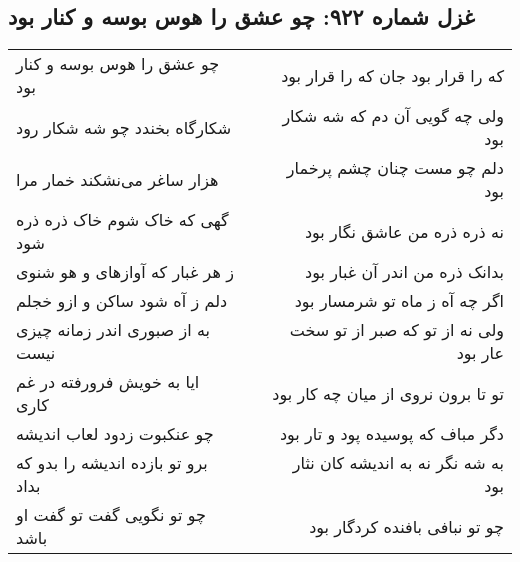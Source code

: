 \begin{center}
\section*{غزل شماره ۹۲۲: چو عشق را هوس بوسه و کنار بود}
\label{sec:0922}
\begin{longtable}{l p{0.5cm} r}
چو عشق را هوس بوسه و کنار بود
&&
که را قرار بود جان که را قرار بود
\\
شکارگاه بخندد چو شه شکار رود
&&
ولی چه گویی آن دم که شه شکار بود
\\
هزار ساغر می‌نشکند خمار مرا
&&
دلم چو مست چنان چشم پرخمار بود
\\
گهی که خاک شوم خاک ذره ذره شود
&&
نه ذره ذره من عاشق نگار بود
\\
ز هر غبار که آوازهای و هو شنوی
&&
بدانک ذره من اندر آن غبار بود
\\
دلم ز آه شود ساکن و ازو خجلم
&&
اگر چه آه ز ماه تو شرمسار بود
\\
به از صبوری اندر زمانه چیزی نیست
&&
ولی نه از تو که صبر از تو سخت عار بود
\\
ایا به خویش فرورفته در غم کاری
&&
تو تا برون نروی از میان چه کار بود
\\
چو عنکبوت زدود لعاب اندیشه
&&
دگر مباف که پوسیده پود و تار بود
\\
برو تو بازده اندیشه را بدو که بداد
&&
به شه نگر نه به اندیشه کان نثار بود
\\
چو تو نگویی گفت تو گفت او باشد
&&
چو تو نبافی بافنده کردگار بود
\\
\end{longtable}
\end{center}

